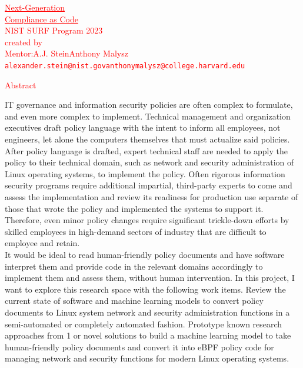 \documentclass[11pt]{article}
\begin{document}
\begin{center}
    \textcolor{red}{
    \HUGE \underline{Next-Generation} \\
    \HUGE \underline{Compliance as Code} \\
    \bigskip
    \Huge NIST SURF Program 2023 \\
    \bigskip
    \large created by \\
    \medskip
    \hspace{-0.4cm}\Large Mentor:\hspace{0.5cm}A.J. Stein\hspace{4.5cm}Anthony Malysz\\
    \hspace{0.7cm}\normalsize\texttt{alexander.stein@nist.gov}\hspace{4cm}\texttt{anthonymalysz@college.harvard.edu} \\
    }
\end{center}

\vspace{1.5em}
\begin{blackbox}{\begin{center}\LARGE\textcolor{red}{Abstract}\Large\end{center}}
\normalfont
\large\phantom{~~~~} IT governance and information security policies are often complex to formulate, and even more complex to implement. Technical management and organization executives draft policy language with the intent to inform all employees, not engineers, let alone the computers themselves that must actualize said policies. After policy language is drafted, expert technical staff are needed to apply the policy to their technical domain, such as network and security administration of Linux operating systems, to implement the policy. Often rigorous information security programs require additional impartial, third-party experts to come and assess the implementation and review its readiness for production use separate of those that wrote the policy and implemented the systems to support it. Therefore, even minor policy changes require significant trickle-down efforts by skilled employees in high-demand sectors of industry that are difficult to employee and retain. \\ 
\phantom{~~~~} It would be ideal to read human-friendly policy documents and have software interpret them and provide code in the relevant domains accordingly to implement them and assess them, without human intervention. In this project, I want to explore this research space with the following work items. Review the current state of software and machine learning models to convert policy documents to Linux system network and security administration functions in a semi-automated or completely automated fashion. Prototype known research approaches from 1 or novel solutions to build a machine learning model to take human-friendly policy documents and convert it into eBPF policy code for managing network and security functions for modern Linux operating systems.
\end{blackbox}
\end{document}
